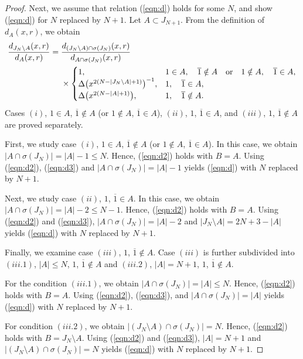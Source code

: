 \documentclass[pdftex]{sigma}
\numberwithin{equation}{section}
\begin{document}
\begin{proof}
Next, we assume that relation (\ref{eqn:d}) holds for some $N$, and show (\ref{eqn:d})
for $N$ replaced by $N+1$.
Let $A \subset J_{N+1}$.
From the definition of $d_A(x,r)$, we obtain
\begin{align}
\frac{d_{J_N \setminus A}(x,r)}{d_A(x,r)}={}&
\frac{d_{(J_N \setminus A)\cap \sigma(J_N)}(x,r)}{d_{A \cap \sigma(J_N)}(x,r)}\notag
\\
&\times\begin{cases}
1,& 1\in A,\quad \overline{1} \notin A\quad {\rm or}\quad 1\notin A,\quad \overline{1} \in A,
\\
\Delta\big(x^{2(N-|J_N \setminus A|+1)}\big)^{-1},& 1,\quad \overline{1} \in A,
\\
\Delta\big(x^{2(N-|A|+1)}\big),& 1,\quad \overline{1} \notin A.
\end{cases}
\label{eqn:d3}
\end{align}
Cases $(i)$, $1\in A$, $\overline{1} \notin A$ (or $1\notin A$, $\overline{1} \in A$),
$(ii)$, $1$, $\overline{1} \in A$, and $(iii)$, $1$, $\overline{1} \notin A$ are proved separately.

First, we study case $(i)$,
$1\in A$, $\overline{1} \notin A$ (or $1\notin A$, $\overline{1} \in A$).
In this case, we obtain $|A \cap \sigma(J_N)|=|A|-1 \leq N$.
Hence, (\ref{eqn:d2}) holds with $B=A$.
Using (\ref{eqn:d2}), (\ref{eqn:d3}) and $|A \cap \sigma(J_N)|=|A|-1$ yields
(\ref{eqn:d}) with {$N$ replaced by $N+1$}.

Next, we study case $(ii)$, $1$, $\overline{1} \in A$.
In this case, we obtain $|A \cap \sigma(J_N)|=|A|-2 \leq N-1$.
Hence, (\ref{eqn:d2}) holds with $B=A$.
Using (\ref{eqn:d2}) and (\ref{eqn:d3}), $|A \cap \sigma(J_N)|=|A|-2$ and
$|J_N \setminus A|=2N+3-|A|$ yields (\ref{eqn:d}) with {$N$ replaced by $N+1$}.

Finally, we examine case $(iii)$, $1$, $\overline{1} \notin A$.
Case $(iii)$ is further subdivided into $(iii.1)$, $|A|\leq N$, $1$, $\overline{1} \notin A$ and $(iii.2)$, $|A|=N+1$, $1$, $\overline{1} \notin A$.

For the condition $(iii.1)$, we obtain $|A \cap \sigma(J_N)|=|A|\leq N$.
Hence, (\ref{eqn:d2}) holds with $B=A$.
Using (\ref{eqn:d2}), (\ref{eqn:d3}), and $|A \cap \sigma(J_N)|=|A|$ yields
(\ref{eqn:d}) with {$N$ replaced by $N+1$}.

For condition $(iii.2)$, we obtain $|(J_N \setminus A) \cap \sigma(J_N)|=N$.
Hence, (\ref{eqn:d2}) holds with $B=J_N \setminus A$.
Using (\ref{eqn:d2}) and (\ref{eqn:d3}), $|A|=N+1$ and
$|(J_N \setminus A) \cap \sigma(J_N)|=N$ yields
(\ref{eqn:d}) with {$N$ replaced by $N+1$}.
\end{proof}
\end{document}
